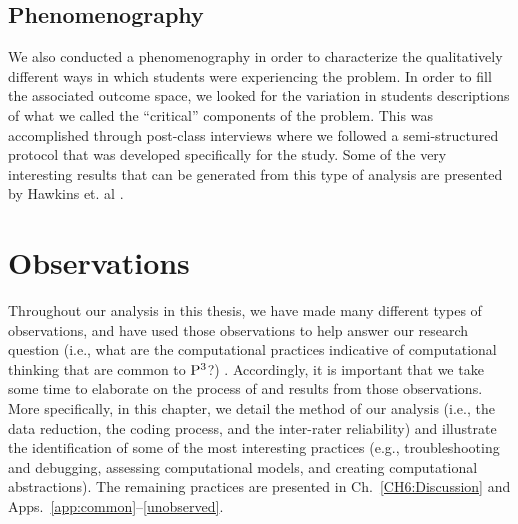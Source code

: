 \documentclass{msuphddissertation}
\begin{document}
\begin{doublespace}
\section{Phenomenography}\label{Sec:Phenom}

We also conducted a phenomenography in order to characterize the qualitatively different ways in which students were experiencing the problem.  In order to fill the associated outcome space, we looked for the variation in students descriptions of what we called the ``critical'' components of the problem.  This was accomplished through post-class interviews where we followed a semi-structured protocol that was developed specifically for the study.  Some of the very interesting results that can be generated from this type of analysis are presented by Hawkins et. al \cite{Hawkins2017}.



\chapter{Observations}\label{CH5:Observations}

Throughout our analysis in this thesis, we have made many different types of observations, and have used those observations to help answer our research question (i.e., what are the computational practices indicative of computational thinking that are common to ${\rm P}^{3}$?) .  Accordingly, it is important that we take some time to elaborate on the process of and results from those observations.  More specifically, in this chapter, we detail the method of our analysis (i.e., the data reduction, the coding process, and the inter-rater reliability) and illustrate the identification of some of the most interesting practices (e.g., troubleshooting and debugging, assessing computational models, and creating computational abstractions).  The remaining practices are presented in Ch.~\ref{CH6:Discussion} and Apps.~\ref{app:common}--\ref{unobserved}.


\end{doublespace}
\end{document}
